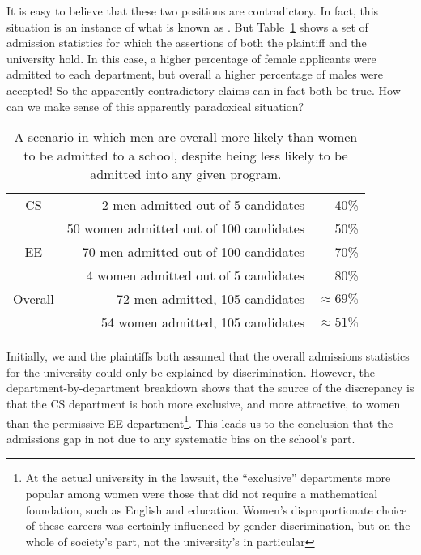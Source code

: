 It is easy to believe that these two positions are contradictory.  In
fact, this situation is an instance of what is known as
.  But Table~\ref{fig:15D3} shows a set of
admission statistics for which the assertions of both the plaintiff
and the university hold.  In this case, a higher percentage of female
applicants were admitted to each department, but overall a higher
percentage of males were accepted!  So the apparently contradictory
claims can in fact both be true.  How can we make sense of this
apparently paradoxical situation?

\begin{table}

\begin{tabular}{crr}
CS & 2 men admitted out of 5 candidates      &   40\% \\
   & 50 women admitted out of 100 candidates     &  50\% \\
EE & 70 men admitted out of 100 candidates   &  70\% \\
   & 4 women admitted out of 5 candidates         & 80\% \\
\hline
Overall & 72 men admitted, 105 candidates & $\approx 69\%$ \\
        & 54 women admitted, 105 candidates   & $\approx 51\%$
\end{tabular}

\caption{A scenario in which men are overall more likely than women to
  be admitted to a school, despite being less likely to be admitted
  into any given program.}

\label{fig:15D3}

\end{table}

Initially, we and the plaintiffs both assumed that the overall
admissions statistics for the university could only be explained by
discrimination.  However, the department-by-department breakdown shows
that the source of the discrepancy is that the CS department is both
more exclusive, and more attractive, to women than the permissive EE
department\footnote{At the actual university in the lawsuit, the
  ``exclusive'' departments more popular among women were those that
  did not require a mathematical foundation, such as English and
  education.  Women's disproportionate choice of these careers was
  certainly influenced by gender discrimination, but on the whole of
  society's part, not the university's in particular}.  This leads us
to the conclusion that the admissions gap in not due to any systematic
bias on the school's part.

